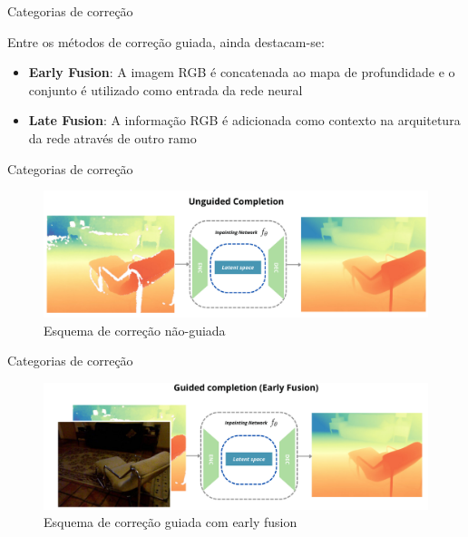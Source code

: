 \documentclass[aspectratio=169]{beamer}
\begin{document}
\begin{frame}{Categorias de correção}

Entre os métodos de correção guiada, ainda destacam-se:

\begin{itemize}
    \item \textbf{Early Fusion}: A imagem RGB é concatenada ao mapa de profundidade e o conjunto é utilizado como entrada da rede neural
    \item \textbf{Late Fusion}: A informação RGB é adicionada como contexto na arquitetura da rede através de outro ramo
\end{itemize}
    
\end{frame}

\begin{frame}{Categorias de correção}

\begin{figure}
    \centering
    \includegraphics[width=\textwidth]{figs/unguided1.png}
    \caption{Esquema de correção não-guiada}
    \label{fig:enter-label}
\end{figure}
    
\end{frame}

\begin{frame}{Categorias de correção}

\begin{figure}
    \centering
    \includegraphics[width=\textwidth]{figs/earlyfusion1.png}
    \caption{Esquema de correção guiada com early fusion}
    \label{fig:enter-label}
\end{figure}
    
\end{frame}
\end{document}
